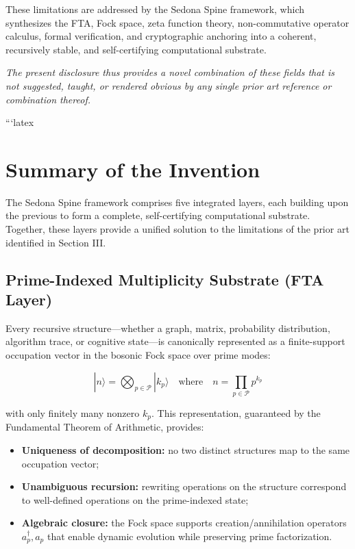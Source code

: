\documentclass[12pt]{article}
\theoremstyle{plain}
\theoremstyle{definition}
\theoremstyle{remark}
\begin{document}
These limitations are addressed by the Sedona Spine framework, which synthesizes the FTA, Fock space, zeta function theory, non-commutative operator calculus, formal verification, and cryptographic anchoring into a coherent, recursively stable, and self-certifying computational substrate.

\vspace{0.3cm}
\noindent
\textit{The present disclosure thus provides a novel combination of these fields that is not suggested, taught, or rendered obvious by any single prior art reference or combination thereof.}

```latex
\section{Summary of the Invention}

The Sedona Spine framework comprises five integrated layers, each building upon the previous to form a complete, self-certifying computational substrate. Together, these layers provide a unified solution to the limitations of the prior art identified in Section III.

\subsection{Prime-Indexed Multiplicity Substrate (FTA Layer)}

Every recursive structure—whether a graph, matrix, probability distribution, algorithm trace, or cognitive state—is canonically represented as a finite-support occupation vector in the bosonic Fock space over prime modes:

\[
|n\rangle = \bigotimes_{p \in \mathcal{P}} |k_p\rangle \quad\text{where}\quad n = \prod_{p \in \mathcal{P}} p^{k_p}
\]

with only finitely many nonzero $k_p$. This representation, guaranteed by the Fundamental Theorem of Arithmetic, provides:
\begin{itemize}
    \item \textbf{Uniqueness of decomposition:} no two distinct structures map to the same occupation vector;
    \item \textbf{Unambiguous recursion:} rewriting operations on the structure correspond to well-defined operations on the prime-indexed state;
    \item \textbf{Algebraic closure:} the Fock space supports creation/annihilation operators $a_p^\dagger, a_p$ that enable dynamic evolution while preserving prime factorization.
\end{itemize}
\end{document}
